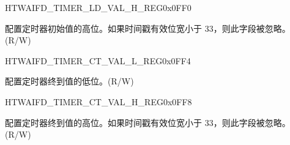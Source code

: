 \begin{register}{H}{TWAIFD\_TIMER\_LD\_VAL\_H\_REG}{0x0FF0}\label{regdesc:TWAIFDTIMERLDVALHREG}
%
\regnewline%
\begin{regdesc}\begin{reglist}
\label{fielddesc:TWAIFDTIMERLDVALH}\item [TWAIFD\_TIMER\_LD\_VAL\_H] 配置定时器初始值的高位。如果时间戳有效位宽小于 33，则此字段被忽略。(R/W)
\end{reglist}\end{regdesc}
\end{register}


\begin{register}{H}{TWAIFD\_TIMER\_CT\_VAL\_L\_REG}{0x0FF4}\label{regdesc:TWAIFDTIMERCTVALLREG}
%
\regnewline%
\begin{regdesc}\begin{reglist}
\label{fielddesc:TWAIFDTIMERCTVALL}\item [TWAIFD\_TIMER\_CT\_VAL\_L] 配置定时器终到值的低位。(R/W)
\end{reglist}\end{regdesc}
\end{register}


\begin{register}{H}{TWAIFD\_TIMER\_CT\_VAL\_H\_REG}{0x0FF8}\label{regdesc:TWAIFDTIMERCTVALHREG}
%
\regnewline%
\begin{regdesc}\begin{reglist}
\label{fielddesc:TWAIFDTIMERCTVALH}\item [TWAIFD\_TIMER\_CT\_VAL\_H] 配置定时器终到值的高位。如果时间戳有效位宽小于 33，则此字段被忽略。(R/W)
\end{reglist}\end{regdesc}
\end{register}


